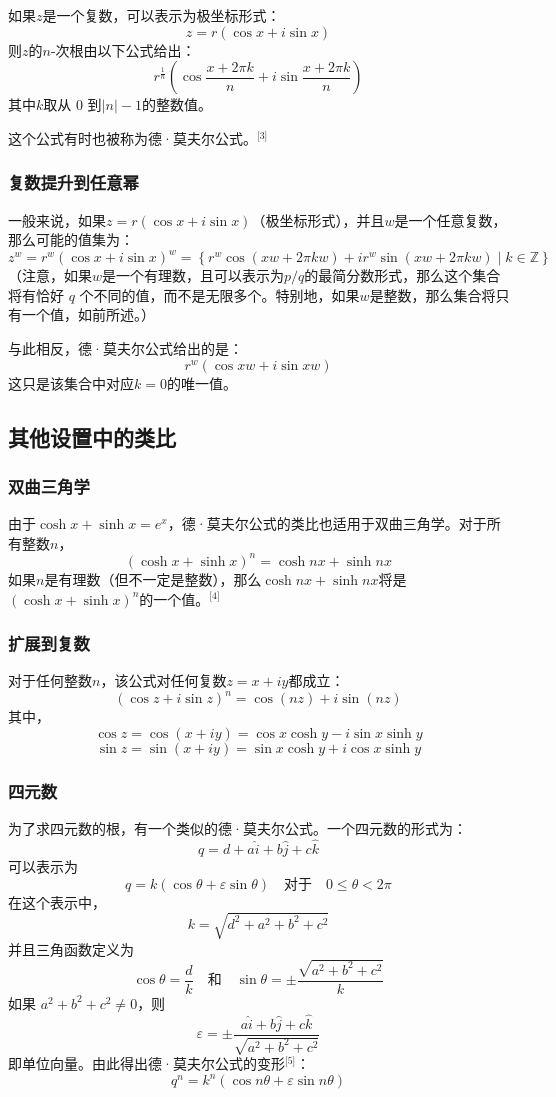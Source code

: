 如果\( z \)是一个复数，可以表示为极坐标形式：
\[
z = r \left( \cos x + i \sin x \right)~
\]
则\( z \)的\( n \)-次根由以下公式给出：
\[
r^{\frac{1}{n}} \left( \cos \frac{x + 2\pi k}{n} + i \sin \frac{x + 2\pi k}{n} \right)~
\]
其中\( k \)取从 0 到\( |n| - 1 \)的整数值。

这个公式有时也被称为德·莫夫尔公式。\(^\text{[3]}\)
\subsubsection{复数提升到任意幂}  
一般来说，如果\(z = r (\cos x + i \sin x)\)（极坐标形式），并且\(w\)是一个任意复数，那么可能的值集为：
\[
z^w = r^w \left( \cos x + i \sin x \right)^w = \left\{ r^w \cos \left( xw + 2\pi kw \right) + i r^w \sin \left( xw + 2\pi kw \right) \mid k \in \mathbb{Z} \right\}~
\]
（注意，如果\( w \)是一个有理数，且可以表示为\(p/q\)的最简分数形式，那么这个集合将有恰好 \( q \) 个不同的值，而不是无限多个。特别地，如果\( w \)是整数，那么集合将只有一个值，如前所述。）  

与此相反，德·莫夫尔公式给出的是：
\[
r^w (\cos xw + i \sin xw)~
\]
这只是该集合中对应\( k = 0 \)的唯一值。
\subsection{其他设置中的类比}  
\subsubsection{双曲三角学}  
由于\( \cosh x + \sinh x = e^x \)，德·莫夫尔公式的类比也适用于双曲三角学。对于所有整数\(n\)，
\[
(\cosh x + \sinh x)^n = \cosh nx + \sinh nx~
\]
如果\( n \)是有理数（但不一定是整数），那么\(\cosh nx + \sinh nx\)将是\( (\cosh x + \sinh x)^n \)的一个值。\(^\text{[4]}\)
\subsubsection{扩展到复数}  
对于任何整数\( n \)，该公式对任何复数\( z = x + iy \)都成立：
\[
(\cos z + i \sin z)^n = \cos(nz) + i \sin(nz)~
\]
其中，
\[
\cos z = \cos(x + iy) = \cos x \cosh y - i \sin x \sinh y~
\]
\[
\sin z = \sin(x + iy) = \sin x \cosh y + i \cos x \sinh y~
\]
\subsubsection{四元数}  
为了求四元数的根，有一个类似的德·莫夫尔公式。一个四元数的形式为：
\[
q = d + a\hat{i} + b\hat{j} + c\hat{k}~
\]
可以表示为
\[
q = k (\cos \theta + \varepsilon \sin \theta) \quad \text{对于} \quad 0 \leq \theta < 2\pi~
\]
在这个表示中，
\[
k = \sqrt{d^2 + a^2 + b^2 + c^2}~
\]
并且三角函数定义为
\[
\cos \theta = \frac{d}{k} \quad \text{和} \quad \sin \theta = \pm \frac{\sqrt{a^2 + b^2 + c^2}}{k}~
\]
如果 \( a^2 + b^2 + c^2 \neq 0 \)，则
\[
\varepsilon = \pm \frac{a \hat{i} + b \hat{j} + c \hat{k}}{\sqrt{a^2 + b^2 + c^2}}~
\]
即单位向量。由此得出德·莫夫尔公式的变形\(^\text{[5]}\)：
\[
q^n = k^n (\cos n\theta + \varepsilon \sin n\theta)~
\]